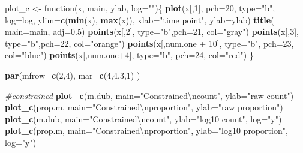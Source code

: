 \documentclass[twocolumn]{article}
\newenvironment{Shaded}{\begin{snugshade}}{\end{snugshade}}
\newcommand{\KeywordTok}[1]{\textcolor[rgb]{0.13,0.29,0.53}{\textbf{{#1}}}}
\newcommand{\DataTypeTok}[1]{\textcolor[rgb]{0.13,0.29,0.53}{{#1}}}
\newcommand{\DecValTok}[1]{\textcolor[rgb]{0.00,0.00,0.81}{{#1}}}
\newcommand{\FloatTok}[1]{\textcolor[rgb]{0.00,0.00,0.81}{{#1}}}
\newcommand{\CharTok}[1]{\textcolor[rgb]{0.31,0.60,0.02}{{#1}}}
\newcommand{\StringTok}[1]{\textcolor[rgb]{0.31,0.60,0.02}{{#1}}}
\newcommand{\CommentTok}[1]{\textcolor[rgb]{0.56,0.35,0.01}{\textit{{#1}}}}
\newcommand{\NormalTok}[1]{{#1}}
\begin{document}
\begin{Shaded}
\begin{Highlighting}[]
\NormalTok{plot_c <-}\StringTok{ }\NormalTok{function(x, main, ylab, }\DataTypeTok{log=}\StringTok{""}\NormalTok{)\{}
    \KeywordTok{plot}\NormalTok{(x[,}\DecValTok{1}\NormalTok{], }\DataTypeTok{pch=}\DecValTok{20}\NormalTok{, }\DataTypeTok{type=}\StringTok{"b"}\NormalTok{,  }\DataTypeTok{log=}\NormalTok{log,}
    \DataTypeTok{ylim=}\KeywordTok{c}\NormalTok{(}\KeywordTok{min}\NormalTok{(x), }\KeywordTok{max}\NormalTok{(x)), }\DataTypeTok{xlab=}\StringTok{"time point"}\NormalTok{,}
    \DataTypeTok{ylab=}\NormalTok{ylab)}
    \KeywordTok{title}\NormalTok{( }\DataTypeTok{main=}\NormalTok{main, }\DataTypeTok{adj=}\FloatTok{0.5}\NormalTok{)}
    \KeywordTok{points}\NormalTok{(x[,}\DecValTok{2}\NormalTok{], }\DataTypeTok{type=}\StringTok{"b"}\NormalTok{,}\DataTypeTok{pch=}\DecValTok{21}\NormalTok{, }\DataTypeTok{col=}\StringTok{"gray"}\NormalTok{)}
    \KeywordTok{points}\NormalTok{(x[,}\DecValTok{3}\NormalTok{], }\DataTypeTok{type=}\StringTok{"b"}\NormalTok{,}\DataTypeTok{pch=}\DecValTok{22}\NormalTok{, }\DataTypeTok{col=}\StringTok{"orange"}\NormalTok{)}
    \KeywordTok{points}\NormalTok{(x[,num.one +}\StringTok{ }\DecValTok{10}\NormalTok{], }\DataTypeTok{type=}\StringTok{"b"}\NormalTok{,}
        \DataTypeTok{pch=}\DecValTok{23}\NormalTok{, }\DataTypeTok{col=}\StringTok{"blue"}\NormalTok{)}
    \KeywordTok{points}\NormalTok{(x[,num.one}\DecValTok{+4}\NormalTok{], }\DataTypeTok{type=}\StringTok{"b"}\NormalTok{, }\DataTypeTok{pch=}\DecValTok{24}\NormalTok{,}
        \DataTypeTok{col=}\StringTok{"red"}\NormalTok{)}
\NormalTok{\}}

\KeywordTok{par}\NormalTok{(}\DataTypeTok{mfrow=}\KeywordTok{c}\NormalTok{(}\DecValTok{2}\NormalTok{,}\DecValTok{4}\NormalTok{), }\DataTypeTok{mar=}\KeywordTok{c}\NormalTok{(}\DecValTok{4}\NormalTok{,}\DecValTok{4}\NormalTok{,}\DecValTok{3}\NormalTok{,}\DecValTok{1}\NormalTok{) )}

\CommentTok{#constrained}
\KeywordTok{plot_c}\NormalTok{(m.dub, }\DataTypeTok{main=}\StringTok{"Constrained}\CharTok{\textbackslash{}n}\StringTok{count"}\NormalTok{,}
    \DataTypeTok{ylab=}\StringTok{"raw count"}\NormalTok{)}
\KeywordTok{plot_c}\NormalTok{(prop.m, }\DataTypeTok{main=}\StringTok{"Constrained}\CharTok{\textbackslash{}n}\StringTok{proportion"}\NormalTok{,}
    \DataTypeTok{ylab=}\StringTok{"raw proportion"}\NormalTok{)}
\KeywordTok{plot_c}\NormalTok{(m.dub, }\DataTypeTok{main=}\StringTok{"Constrained}\CharTok{\textbackslash{}n}\StringTok{count"}\NormalTok{,}
    \DataTypeTok{ylab=}\StringTok{"log10 count"}\NormalTok{, }\DataTypeTok{log=}\StringTok{"y"}\NormalTok{)}
\KeywordTok{plot_c}\NormalTok{(prop.m, }\DataTypeTok{main=}\StringTok{"Constrained}\CharTok{\textbackslash{}n}\StringTok{proportion"}\NormalTok{,}
    \DataTypeTok{ylab=}\StringTok{"log10 proportion"}\NormalTok{, }\DataTypeTok{log=}\StringTok{"y"}\NormalTok{)}


\end{Highlighting}
\end{Shaded}
\end{document}
